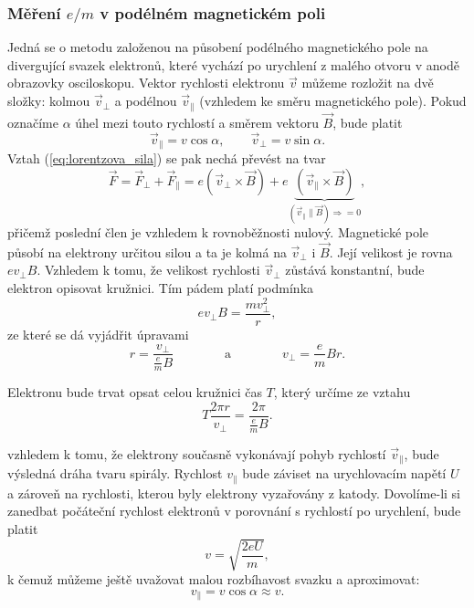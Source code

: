 \documentclass[english]{article}
\begin{document}
		\subsubsection{Měření $e/m$ v podélném magnetickém poli}
			Jedná se o metodu založenou na působení podélného magnetického pole na divergující svazek elektronů, které vychází po urychlení z malého otvoru v anodě obrazovky osciloskopu. Vektor rychlosti elektronu $\vec{v}$ můžeme rozložit na dvě složky: kolmou $\vec{v}_{\perp}$ a podélnou $\vec{v}_{\parallel}$ (vzhledem ke směru magnetického pole). Pokud označíme $\alpha$ úhel mezi touto rychlostí a směrem vektoru $\vec{B}$, bude platit
			\begin{equation}
			\vec{v}_{\parallel} = v \cos \alpha, \qquad \vec{v}_{\perp} = v \sin \alpha.
			\end{equation}
			Vztah (\ref{eq:lorentzova_sila}) se pak nechá převést na tvar
			\begin{equation}
			\vec{F} = \vec{F}_{\perp} + \vec{F}_{\parallel} = e \left( \vec{v}_{\perp} \times \vec{B} \right) + e \underbrace{\left( \vec{v}_{\parallel} \times \vec{B} \right)}_{ (\vec{v}_{\parallel}\parallel\vec{B})\Rightarrow =0},
			\end{equation}
			přičemž poslední člen je vzhledem k rovnoběžnosti nulový. Magnetické pole působí na elektrony určitou silou a ta je kolmá na $\vec{v}_{\perp}$ i $\vec{B}$. Její velikost je rovna $e v_{\perp} B$. Vzhledem k tomu, že velikost rychlosti $\vec{v}_\perp$ zůstává konstantní, bude elektron opisovat kružnici. Tím pádem platí podmínka
			\begin{equation}
			e v_\perp B = \frac{m v_\perp^2}{r},
			\end{equation}
			ze které se dá vyjádřit úpravami
			\begin{equation}
			r = \frac{v_\perp}{\frac{e}{m} B} \qquad \qquad \text{a} \qquad \qquad v_\perp = \frac{e}{m} B r.
			\end{equation}
			
			Elektronu bude trvat opsat celou kružnici čas $T$, který určíme ze vztahu
			\begin{equation}
			T \frac{2 \pi r}{v_\perp} = \frac{2 \pi}{\frac{e}{m} B}.
			\end{equation}
			
			vzhledem k tomu, že elektrony současně vykonávají pohyb rychlostí $\vec{v}_\parallel$, bude výsledná dráha tvaru spirály. Rychlost $v_\parallel$ bude záviset na urychlovacím napětí $U$ a zároveň na rychlosti, kterou byly elektrony vyzařovány z katody. Dovolíme-li si zanedbat počáteční rychlost elektronů v porovnání s rychlostí po urychlení, bude platit
			\begin{equation} \label{eq:urychlovaci_rychlost}
			v = \sqrt{\frac{2 e U}{m}},
			\end{equation}
			k čemuž můžeme ještě uvažovat malou rozbíhavost svazku a aproximovat: 
			\begin{equation}
			v_\parallel = v \cos \alpha \approx v.
			\end{equation}
			
\end{document}
